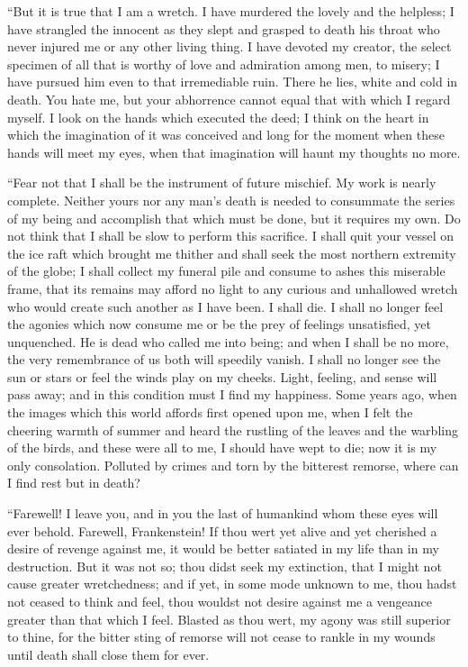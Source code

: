 \documentclass[12pt,openright]{book}
\begin{document}
“But it is true that I am a wretch. I have murdered the lovely and the helpless; I have strangled the innocent as they slept and grasped to death his throat who never injured me or any other living thing. I have devoted my creator, the select specimen of all that is worthy of love and admiration among men, to misery; I have pursued him even to that irremediable ruin. There he lies, white and cold in death. You hate me, but your abhorrence cannot equal that with which I regard myself. I look on the hands which executed the deed; I think on the heart in which the imagination of it was conceived and long for the moment when these hands will meet my eyes, when that imagination will haunt my thoughts no more.

“Fear not that I shall be the instrument of future mischief. My work is nearly complete. Neither yours nor any man’s death is needed to consummate the series of my being and accomplish that which must be done, but it requires my own. Do not think that I shall be slow to perform this sacrifice. I shall quit your vessel on the ice raft which brought me thither and shall seek the most northern extremity of the globe; I shall collect my funeral pile and consume to ashes this miserable frame, that its remains may afford no light to any curious and unhallowed wretch who would create such another as I have been. I shall die. I shall no longer feel the agonies which now consume me or be the prey of feelings unsatisfied, yet unquenched. He is dead who called me into being; and when I shall be no more, the very remembrance of us both will speedily vanish. I shall no longer see the sun or stars or feel the winds play on my cheeks. Light, feeling, and sense will pass away; and in this condition must I find my happiness. Some years ago, when the images which this world affords first opened upon me, when I felt the cheering warmth of summer and heard the rustling of the leaves and the warbling of the birds, and these were all to me, I should have wept to die; now it is my only consolation. Polluted by crimes and torn by the bitterest remorse, where can I find rest but in death?

“Farewell! I leave you, and in you the last of humankind whom these eyes will ever behold. Farewell, Frankenstein! If thou wert yet alive and yet cherished a desire of revenge against me, it would be better satiated in my life than in my destruction. But it was not so; thou didst seek my extinction, that I might not cause greater wretchedness; and if yet, in some mode unknown to me, thou hadst not ceased to think and feel, thou wouldst not desire against me a vengeance greater than that which I feel. Blasted as thou wert, my agony was still superior to thine, for the bitter sting of remorse will not cease to rankle in my wounds until death shall close them for ever.
\end{document}
